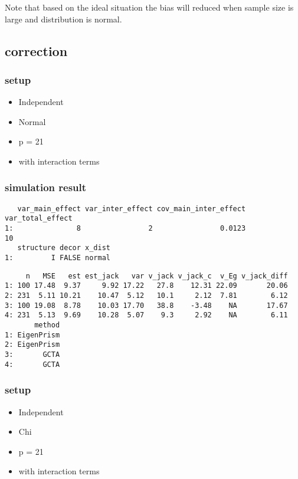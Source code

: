 \documentclass[]{article}
\providecommand{\tightlist}{%
  \setlength{\itemsep}{0pt}\setlength{\parskip}{0pt}}
\begin{document}
Note that based on the ideal situation the bias will reduced when sample
size is large and distribution is normal.

\subsection{correction}\label{correction}

\subsubsection{setup}\label{setup-2}

\begin{itemize}
\tightlist
\item
  Independent
\item
  Normal
\item
  p = 21
\item
  with interaction terms
\end{itemize}

\subsubsection{simulation result}\label{simulation-result}

\begin{verbatim}
   var_main_effect var_inter_effect cov_main_inter_effect var_total_effect
1:               8                2                0.0123               10
   structure decor x_dist
1:         I FALSE normal
\end{verbatim}

\begin{verbatim}
     n   MSE   est est_jack   var v_jack v_jack_c  v_Eg v_jack_diff
1: 100 17.48  9.37     9.92 17.22   27.8    12.31 22.09       20.06
2: 231  5.11 10.21    10.47  5.12   10.1     2.12  7.81        6.12
3: 100 19.08  8.78    10.03 17.70   38.8    -3.48    NA       17.67
4: 231  5.13  9.69    10.28  5.07    9.3     2.92    NA        6.11
       method
1: EigenPrism
2: EigenPrism
3:       GCTA
4:       GCTA
\end{verbatim}

\subsubsection{setup}\label{setup-3}

\begin{itemize}
\tightlist
\item
  Independent
\item
  Chi
\item
  p = 21
\item
  with interaction terms
\end{itemize}
\end{document}
